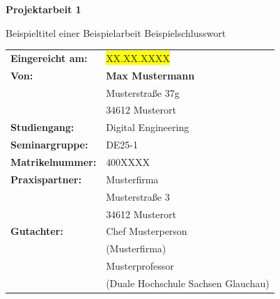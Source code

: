 \begin{titlepage}

\centering

\vspace{1cm}

{\Huge\bfseries Projektarbeit 1\par}

\vspace{1cm}

{\Large
Beispieltitel einer 
Beispielarbeit
Beispielschlusswort
\par}

\vspace{1cm}

\begin{tabular}{p{5cm}p{9cm}}
\textbf{Eingereicht am:} & 
\colorbox{yellow}{XX.XX.XXXX} \\[0.5em]
\textbf{Von:} &
\textbf{Max Mustermann} \\
&
Musterstraße 37g\\
&
34612 Musterort \\[1em]
\textbf{Studiengang:} &
Digital Engineering \\[1em]
\textbf{Seminargruppe:} &
DE25-1 \\[1em]
\textbf{Matrikelnummer:} &
400XXXX \\[1em]
\textbf{Praxispartner:} &
Musterfirma \\
&
Musterstraße 3 \\
&
34612 Musterort \\[1em]
\textbf{Gutachter:} &
Chef Musterperson \\
&
(Musterfirma) \\
&
Musterprofessor \\
&
(Duale Hochschule Sachsen Glauchau)
\end{tabular}
\end{titlepage}

